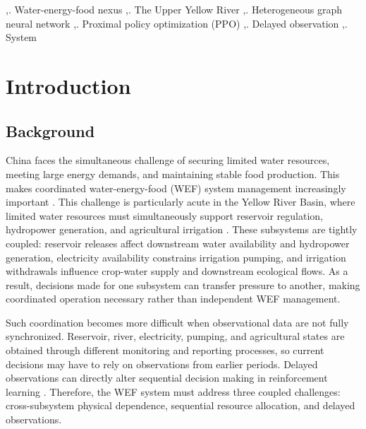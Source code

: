\documentclass [a4paper,fleqn] {cas-dc}
\begin{document}
\begin{keywords}
\sep. Water-energy-food nexus 
\sep. The Upper Yellow River
\sep. Heterogeneous graph neural network
\sep. Proximal policy optimization (PPO)
\sep. Delayed observation
\sep. System
\end{keywords}


\maketitle

\section{Introduction} \label{sec1}
\subsection{Background} \label{sec11}

China faces the simultaneous challenge of securing limited water resources, meeting large energy demands, and maintaining stable food production. This makes coordinated water-energy-food (WEF) system management increasingly important \citep{hoff2011,bazilian2011,zhang2018concepts}. This challenge is particularly acute in the Yellow River Basin, where limited water resources must simultaneously support reservoir regulation, hydropower generation, and agricultural irrigation \citep{si2019,liu2019,Ren2022YellowRiverWEFC,Zhang2024YellowRiverWEFEfficiency}. These subsystems are tightly coupled: reservoir releases affect downstream water availability and hydropower generation, electricity availability constrains irrigation pumping, and irrigation withdrawals influence crop-water supply and downstream ecological flows. As a result, decisions made for one subsystem can transfer pressure to another, making coordinated operation necessary rather than independent WEF management.

Such coordination becomes more difficult when observational data are not fully synchronized. Reservoir, river, electricity, pumping, and agricultural states are obtained through different monitoring and reporting processes, so current decisions may have to rely on observations from earlier periods. Delayed observations can directly alter sequential decision making in reinforcement learning \citep{Agarwal2021DelayedObservations}. Therefore, the WEF system must address three coupled challenges: cross-subsystem physical dependence, sequential resource allocation, and delayed observations.
\end{document}
